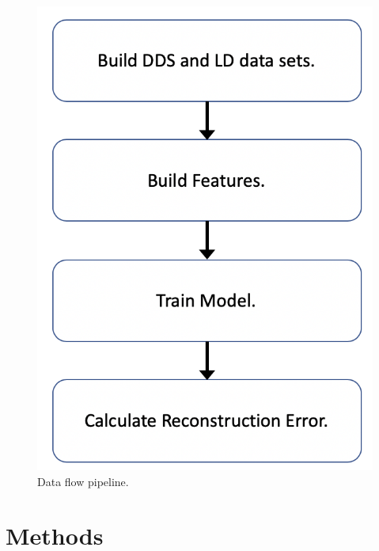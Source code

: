 \documentclass[sigconf]{acmart}
\begin{document}
\begin{figure}
  \centering
  \includegraphics[scale=0.5]{Pipeline1.png}
  \caption{Data flow pipeline.}
  \label{figure:autoencoder}
\end{figure}

\section{Methods}


\end{document}

